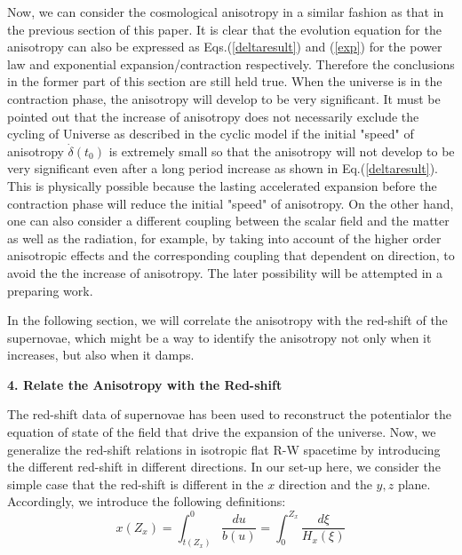 \documentclass[a4paper,preprint]{revtex4}
\begin{document}
Now, we can consider the cosmological anisotropy in a similar
fashion as that in the previous section of this paper. It is clear
that the evolution equation for the anisotropy can also be
expressed as Eqs.(\ref{deltaresult}) and (\ref{exp}) for the power
law and exponential expansion/contraction respectively. Therefore
the conclusions in the former part of this section are still held
true. When the universe is in the contraction phase, the
anisotropy will develop to be very significant. It must be pointed
out that the increase of anisotropy does not necessarily exclude
the cycling of Universe as described in the cyclic model if the
initial "speed" of anisotropy $\dot{\delta}(t_0)$ is extremely
small so that the anisotropy will not develop to be very
significant even after a long period increase as shown in
Eq.(\ref{deltaresult}). This is physically possible because the
lasting accelerated expansion before the contraction phase will
reduce the initial "speed" of anisotropy. On the other hand, one
can also consider a different coupling between the scalar field
and the matter as well as the radiation, for example, by taking
into account of the higher order anisotropic effects and the
corresponding coupling that dependent on direction, to avoid the
the increase of anisotropy. The later possibility will be
attempted in a preparing work.

In the following section, we will correlate the anisotropy with
the red-shift of the supernovae, which might be a way to identify
the anisotropy not only when it increases, but also when it damps.

\vspace{0.4cm} \noindent\textbf{4. Relate the Anisotropy with the
Red-shift}
 \vspace{0.4cm}

 The red-shift data of supernovae has been used to reconstruct the
potential\cite{starobinski, turner1, turner2}or the equation of
state\cite{hao} of the field that drive the expansion of the
universe. Now, we generalize the red-shift relations in isotropic
flat R-W spacetime by introducing the different red-shift in
different directions. In our set-up here, we consider the simple
case that the red-shift is different in the $x$ direction and the
$y,z$ plane. Accordingly, we introduce the following definitions:
\begin{equation}\label{xred}
 x(Z_x)=\int_{t(Z_x)}^0\frac{du}{b(u)}=\int_0^{Z_x}\frac{d\xi}{H_x(\xi)}
\end{equation}
\end{document}
